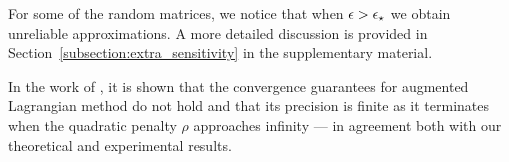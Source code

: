 For some of the random matrices, we notice that when $\epsilon > \epsilon_\star$ we obtain unreliable approximations. A more detailed discussion is provided in Section~\ref{subsection:extra_sensitivity} in the supplementary material.

In the work of \citet{ng_ontheconvergence_2020}, it is shown that the convergence guarantees for augmented Lagrangian method do not hold and that its precision is finite as it terminates when the quadratic penalty $\rho$ approaches infinity --- in agreement both with our theoretical and experimental results.

